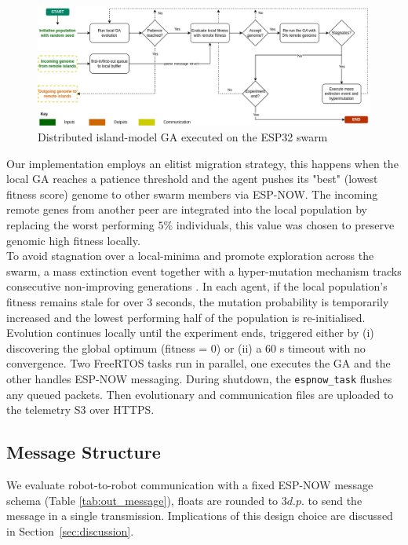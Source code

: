 \documentclass[conference]{IEEEtran}
\begin{document}
\begin{figure}[t]
    \centering
    \includegraphics[width=1\textwidth]{ga.png}
    \caption{Distributed island-model GA executed on the ESP32 swarm}
    \label{fig:ga}
\end{figure}

Our implementation employs an elitist migration strategy, this happens when the local GA reaches a patience threshold and the agent pushes its "best" (lowest fitness score) genome to other swarm members via ESP-NOW. The incoming remote genes from another peer are integrated into the local population by replacing the worst performing $5\%$ individuals, this value was chosen to preserve genomic high fitness locally. \\ 

To avoid stagnation over a local-minima and promote exploration across the swarm, a mass extinction event together with a hyper-mutation mechanism tracks consecutive non-improving generations \cite{krink_self-organized_2001}. In each agent, if the local population's fitness remains stale for over 3 seconds, the mutation probability is temporarily increased and the lowest performing half of the population is re-initialised. \\ 

Evolution continues locally until the experiment ends, triggered either by (i) discovering the global optimum (fitness = 0) or (ii) a 60 s timeout with no convergence. Two FreeRTOS tasks run in parallel, one executes the GA and the other handles ESP-NOW messaging. During shutdown, the \texttt{espnow\_task} flushes any queued packets. Then evolutionary and communication files are uploaded to the telemetry S3 over HTTPS.

\subsection{Message Structure}
We evaluate robot-to-robot communication with a fixed ESP-NOW message schema (Table \ref{tab:out_message}), floats are rounded to $3d.p.$ to send the message in a single transmission. Implications of this design choice are discussed in Section~\ref{sec:discussion}.
\end{document}

